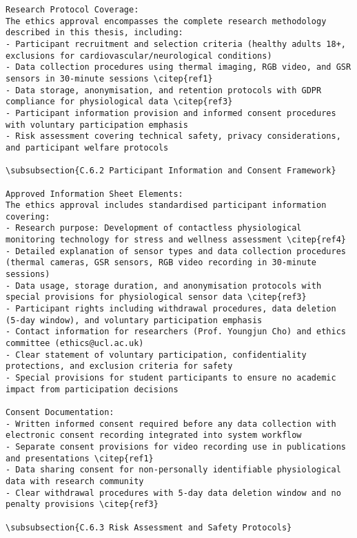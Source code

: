 \begin{verbatim}
Research Protocol Coverage:
The ethics approval encompasses the complete research methodology described in this thesis, including:
- Participant recruitment and selection criteria (healthy adults 18+, exclusions for cardiovascular/neurological conditions)
- Data collection procedures using thermal imaging, RGB video, and GSR sensors in 30-minute sessions \citep{ref1}
- Data storage, anonymisation, and retention protocols with GDPR compliance for physiological data \citep{ref3}
- Participant information provision and informed consent procedures with voluntary participation emphasis
- Risk assessment covering technical safety, privacy considerations, and participant welfare protocols

\subsubsection{C.6.2 Participant Information and Consent Framework}

Approved Information Sheet Elements:
The ethics approval includes standardised participant information covering:
- Research purpose: Development of contactless physiological monitoring technology for stress and wellness assessment \citep{ref4}
- Detailed explanation of sensor types and data collection procedures (thermal cameras, GSR sensors, RGB video recording in 30-minute sessions)
- Data usage, storage duration, and anonymisation protocols with special provisions for physiological sensor data \citep{ref3}
- Participant rights including withdrawal procedures, data deletion (5-day window), and voluntary participation emphasis
- Contact information for researchers (Prof. Youngjun Cho) and ethics committee (ethics@ucl.ac.uk)
- Clear statement of voluntary participation, confidentiality protections, and exclusion criteria for safety
- Special provisions for student participants to ensure no academic impact from participation decisions

Consent Documentation:
- Written informed consent required before any data collection with electronic consent recording integrated into system workflow
- Separate consent provisions for video recording use in publications and presentations \citep{ref1}
- Data sharing consent for non-personally identifiable physiological data with research community
- Clear withdrawal procedures with 5-day data deletion window and no penalty provisions \citep{ref3}

\subsubsection{C.6.3 Risk Assessment and Safety Protocols}


\end{verbatim}

